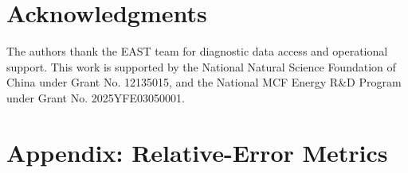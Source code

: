 \documentclass[a4paper,12pt]{article}
\begin{document}
\section*{Acknowledgments}

The authors thank the EAST team for diagnostic data access and operational support. This work is supported by the National Natural Science Foundation of China under Grant No. 12135015, and the National MCF Energy R\&D Program under Grant No. 2025YFE03050001.

\section*{Appendix: Relative-Error Metrics}

\begin{table}[htbp]
\centering\footnotesize
\caption{Mean relative error (MeanRel\% $\pm$ std) of NN methods relative to the mtanh baseline, by diagnostic and plasma mode (H: 14 time points; L: 10 time points). MeanRel\% is dominated by the low-value edge region ($\rho \to 1$), where small absolute deviations produce large relative errors. The L-mode Te rows are inflated by the newly added low-$T_e$ points of shot 156900 (core $T_e$ 0.2--1.1 keV), whose edge values approach zero and make relative error ill-conditioned; on the original four shots the L-mode Te errors were 22--30\%, below the expanded H-mode range of 37--51\%. Best value in each row is \textbf{bold}.}
\label{tab:meanrel}
\end{table}
\end{document}
